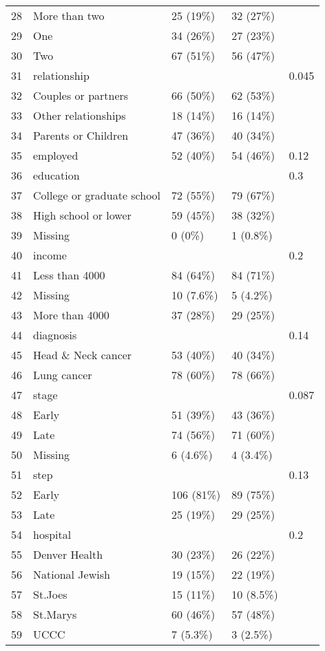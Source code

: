 \begin{table}[ht]
\begin{tabular}{rllll}
  28 & More than two & 25 (19\%) & 32 (27\%) &  \\ 
  29 & One & 34 (26\%) & 27 (23\%) &  \\ 
  30 & Two & 67 (51\%) & 56 (47\%) &  \\ 
  31 & relationship &  &  & 0.045 \\ 
  32 & Couples or partners & 66 (50\%) & 62 (53\%) &  \\ 
  33 & Other relationships & 18 (14\%) & 16 (14\%) &  \\ 
  34 & Parents or Children & 47 (36\%) & 40 (34\%) &  \\ 
  35 & employed & 52 (40\%) & 54 (46\%) & 0.12 \\ 
  36 & education &  &  & 0.3 \\ 
  37 & College or graduate school & 72 (55\%) & 79 (67\%) &  \\ 
  38 & High school or lower & 59 (45\%) & 38 (32\%) &  \\ 
  39 & Missing & 0 (0\%) & 1 (0.8\%) &  \\ 
  40 & income &  &  & 0.2 \\ 
  41 & Less than 4000 & 84 (64\%) & 84 (71\%) &  \\ 
  42 & Missing & 10 (7.6\%) & 5 (4.2\%) &  \\ 
  43 & More than 4000 & 37 (28\%) & 29 (25\%) &  \\ 
  44 & diagnosis &  &  & 0.14 \\ 
  45 & Head \& Neck cancer & 53 (40\%) & 40 (34\%) &  \\ 
  46 & Lung cancer & 78 (60\%) & 78 (66\%) &  \\ 
  47 & stage &  &  & 0.087 \\ 
  48 & Early & 51 (39\%) & 43 (36\%) &  \\ 
  49 & Late & 74 (56\%) & 71 (60\%) &  \\ 
  50 & Missing & 6 (4.6\%) & 4 (3.4\%) &  \\ 
  51 & step &  &  & 0.13 \\ 
  52 & Early & 106 (81\%) & 89 (75\%) &  \\ 
  53 & Late & 25 (19\%) & 29 (25\%) &  \\ 
  54 & hospital &  &  & 0.2 \\ 
  55 & Denver Health & 30 (23\%) & 26 (22\%) &  \\ 
  56 & National Jewish & 19 (15\%) & 22 (19\%) &  \\ 
  57 & St.Joes & 15 (11\%) & 10 (8.5\%) &  \\ 
  58 & St.Marys & 60 (46\%) & 57 (48\%) &  \\ 
  59 & UCCC & 7 (5.3\%) & 3 (2.5\%) &  \\ 
   \hline
\end{tabular}
\end{table}
